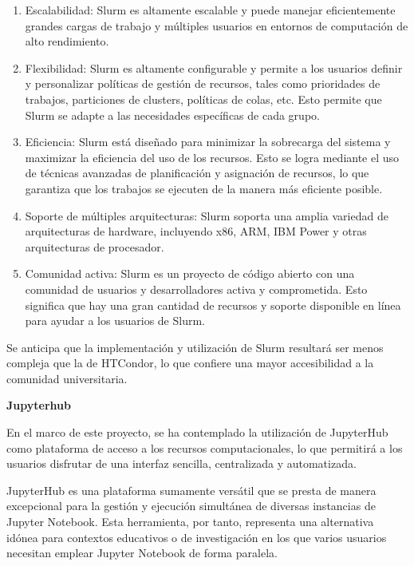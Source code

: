 \begin{spacing}{1.5}
  \begin{enumerate}
    \item Escalabilidad: Slurm es altamente escalable y puede manejar
          eficientemente grandes cargas de trabajo y múltiples usuarios en entornos de
          computación de alto rendimiento.
    \item Flexibilidad: Slurm es altamente configurable y permite a los
          usuarios definir y personalizar políticas de gestión de recursos, tales como
          prioridades de trabajos, particiones de clusters, políticas de colas, etc. Esto
          permite que Slurm se adapte a las necesidades específicas de cada grupo.
    \item Eficiencia: Slurm está diseñado para minimizar la sobrecarga del
          sistema y maximizar la eficiencia del uso de los recursos. Esto se logra
          mediante el uso de técnicas avanzadas de planificación y asignación de
          recursos, lo que garantiza que los trabajos se ejecuten de la manera más
          eficiente posible.
    \item Soporte de múltiples arquitecturas: Slurm soporta una amplia
          variedad de arquitecturas de hardware, incluyendo x86, ARM, IBM Power y otras
          arquitecturas de procesador.
    \item Comunidad activa: Slurm es un proyecto de código abierto con una
          comunidad de usuarios y desarrolladores activa y comprometida. Esto significa
          que hay una gran cantidad de recursos y soporte disponible en línea para ayudar
          a los usuarios de Slurm.
  \end{enumerate}

  Se anticipa que la implementación y utilización de Slurm resultará ser
  menos compleja que la de HTCondor, lo que confiere una mayor accesibilidad a la
  comunidad universitaria.

  \textbf{Jupyterhub}

  En el marco de este proyecto, se ha contemplado la utilización de JupyterHub como plataforma de acceso a los recursos computacionales, lo que permitirá a los usuarios disfrutar de una interfaz sencilla, centralizada y automatizada.

 JupyterHub es una plataforma sumamente versátil que se presta de manera excepcional para la gestión y ejecución simultánea de diversas instancias de Jupyter Notebook. Esta herramienta, por tanto, representa una alternativa idónea para contextos educativos o de investigación en los que varios usuarios necesitan emplear Jupyter Notebook de forma paralela.


\end{spacing}
